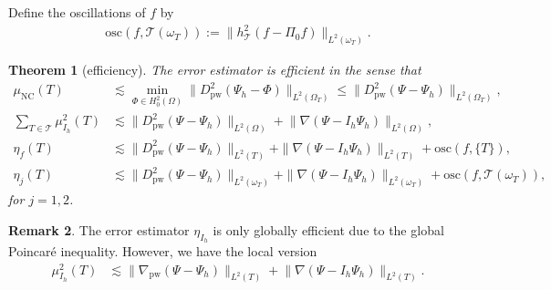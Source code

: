\documentclass[a4paper]{amsart}
\newtheorem{theorem}{Theorem}
\theoremstyle{definition}
\newtheorem{remark}[theorem]{Remark}
\numberwithin{equation}{section}
\numberwithin{theorem}{section}
\newcommand{\pw}{\mathrm{pw}}
\newcommand{\nc}{\mathrm{NC}}
\newcommand{\osc}{\mathrm{osc}}
\newcommand{\tri}{\mathcal{T}}
\begin{document}
Define the oscillations of $f$ by
\begin{align*}
    \osc(f,\tri(\omega_T))
    :=\lVert h_\tri^2(f-\Pi_0 f)\rVert_{L^2(\omega_T)}.
\end{align*}



\begin{theorem}[efficiency]\label{t:vK_efficiency}
    The error estimator is efficient in the sense that 
    \begin{align*}
        \mu_\nc(T) &\lesssim \min_{\Phi\in H^2_0(\Omega)}
                \lVert D_\pw^2(\Psi_h-\Phi)\rVert_{L^2(\Omega_T)}
                \leq \lVert D_\pw^2(\Psi-\Psi_h)\rVert_{L^2(\Omega_T)},\\
        \sum_{T\in\tri}\mu_{I_h}^2(T)
          &\lesssim \lVert D_\pw^2(\Psi-\Psi_h)\rVert_{L^2(\Omega)}
              + \lVert \nabla (\Psi-I_h\Psi_h)\rVert_{L^2(\Omega)},\\
        \eta_f(T)&\lesssim \lVert D_\pw^2(\Psi-\Psi_h)\rVert_{L^2(T)} 
              + \|\nabla(\Psi-I_h\Psi_h)\|_{L^2(T)}+  \osc(f,\{T\}),\\
        \eta_j(T)&\lesssim \lVert D_\pw^2(\Psi-\Psi_h)\rVert_{L^2(\omega_T)}
              + \|\nabla (\Psi-I_h\Psi_h)\|_{L^2(\omega_T)}+  \osc(f,\tri(\omega_T)),
    \end{align*}
    for $j=1,2$.
\end{theorem}

\begin{remark}
    The error estimator $\eta_{I_h}$ is only globally 
    efficient due to the global Poincar\'e inequality.
    However, we have the local version 
    \begin{align*}
        \mu_{I_h}^2(T)
          &\lesssim \lVert \nabla_\pw(\Psi-\Psi_h)\rVert_{L^2(T)}
              + \lVert \nabla (\Psi-I_h\Psi_h)\rVert_{L^2(T)}.
    \end{align*}
\end{remark}
\end{document}
